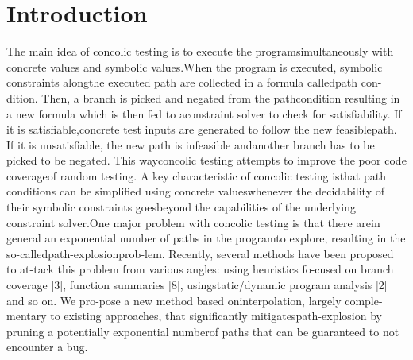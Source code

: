 \documentclass[	runningheads,
				a4paper]{llncs}
\begin{document}
\section{Introduction}
The main idea of concolic testing is to execute the programsimultaneously  with  concrete  values  and  symbolic  values.When the program is executed, symbolic constraints alongthe executed path are collected in a formula calledpath con-dition.  Then, a branch is picked and negated from the pathcondition resulting in a new formula which is then fed to aconstraint solver to check for satisfiability.  If it is satisfiable,concrete test inputs are generated to follow the new feasiblepath.   If  it  is  unsatisfiable,  the  new  path  is  infeasible  andanother branch has to be picked to be negated.  This wayconcolic testing attempts to improve the poor code coverageof random testing.  A key characteristic of concolic testing isthat path conditions can be simplified using concrete valueswhenever the decidability of their symbolic constraints goesbeyond the capabilities of the underlying constraint solver.One major problem with concolic testing is that there arein general an exponential number of paths in the programto  explore,  resulting  in  the  so-calledpath-explosionprob-lem.  Recently, several methods have been proposed to at-tack this problem from various angles:  using heuristics fo-cused on branch coverage [3], function summaries [8], usingstatic/dynamic  program  analysis  [2]  and  so  on.   We  pro-pose a new method based oninterpolation, largely comple-mentary to existing approaches, that significantly mitigatespath-explosion by pruning a potentially exponential numberof paths that can be guaranteed to not encounter a bug.
\end{document}
